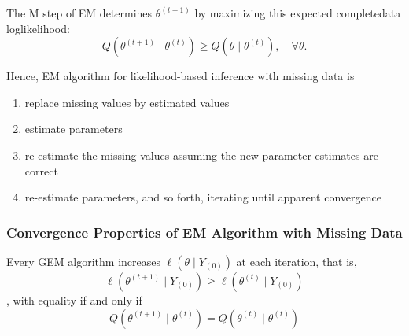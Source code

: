 The M step of EM determines $\theta^{(t+1)}$ by maximizing this expected completedata loglikelihood:
\begin{equation}
    Q\left(\theta^{(t+1)} \mid \theta^{(t)}\right) \geq Q\left(\theta \mid \theta^{(t)}\right), \quad \forall\theta.
\end{equation}

Hence, EM algorithm for likelihood-based inference with missing data is
\begin{enumerate}
    \item replace missing values by estimated
          values
    \item estimate parameters
    \item re-estimate the missing values assuming the new parameter estimates are correct
    \item re-estimate parameters, and so forth, iterating until apparent convergence
\end{enumerate}

\subsubsection{Convergence Properties of EM Algorithm with Missing Data}

\begin{theorem}
    Every GEM algorithm increases $\ell\left(\theta \mid Y_{(0)}\right)$ at each iteration, that is,
    \begin{equation}
        \ell\left(\theta^{(t+1)} \mid Y_{(0)}\right) \geq \ell\left(\theta^{(t)} \mid Y_{(0)}\right)
    \end{equation}
    , with equality if and only if
    \begin{equation}
        Q\left(\theta^{(t+1)} \mid \theta^{(t)}\right)=Q\left(\theta^{(t)} \mid \theta^{(t)}\right)
    \end{equation}
\end{theorem}

